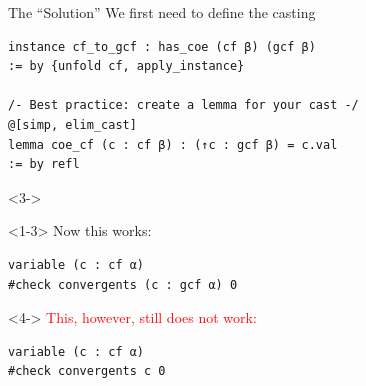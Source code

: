 \documentclass{beamer}
\begin{document}
\begin{frame}[fragile]{The ``Solution''}
We first need to define the casting
\pause
\begin{verbatim}
instance cf_to_gcf : has_coe (cf β) (gcf β)
:= by {unfold cf, apply_instance}

/- Best practice: create a lemma for your cast -/
@[simp, elim_cast]
lemma coe_cf (c : cf β) : (↑c : gcf β) = c.val
:= by refl
\end{verbatim}
\begin{visibleenv}<3->
\begin{onlyenv}<1-3>
\alert{Now this works:}
\begin{verbatim}
variable (c : cf α)
#check convergents (c : gcf α) 0
\end{verbatim}
\end{onlyenv}
\begin{onlyenv}<4->
\textcolor{red}{This, however, still does not work:}
\begin{verbatim}
variable (c : cf α)
#check convergents c 0
\end{verbatim}
\end{onlyenv}
\end{visibleenv}
\end{frame}
\end{document}
